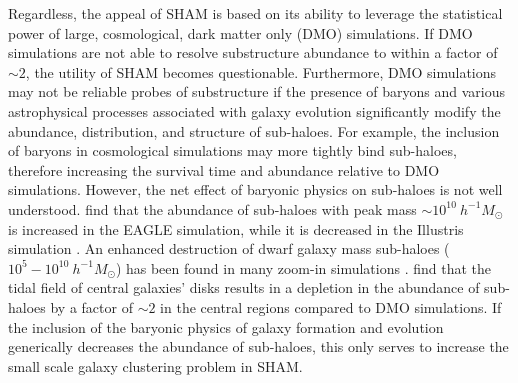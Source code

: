 \documentclass[useAMS,fleqn,usenatbib]{mnras}
\begin{document}
Regardless, the appeal of SHAM is based on its ability to leverage the statistical power of large, cosmological, dark matter only (DMO) simulations.  If DMO simulations are not able to resolve substructure abundance to within a factor of $\sim 2$, the utility of SHAM becomes questionable.  Furthermore, DMO simulations may not be reliable probes of substructure if the presence of baryons and various astrophysical processes associated with galaxy evolution significantly modify the abundance, distribution, and structure of sub-haloes.  For example, the inclusion of baryons in cosmological simulations may more tightly bind sub-haloes, therefore increasing the survival time and abundance \citep{Fiacconi:2016ba} relative to DMO simulations.  However, the net effect of baryonic physics on sub-haloes is not well understood.  \citet{Despali:2016uv} find that the abundance of sub-haloes with peak mass $\sim 10^{10}~h^{-1}M_{\odot}$ is increased in the EAGLE simulation, while it is decreased in the Illustris simulation \citep{Vogelsberger:2014gw}.  An enhanced destruction of dwarf galaxy mass sub-haloes ($10^{5} -10^{10} ~h^{-1}M_{\odot}$) has been found in many zoom-in simulations \citep{Read:2006da, Read:2006hw, Brooks:2014jv, Wetzel:2016iy}.  \citet{GarrisonKimmel:2017tu} find that the tidal field of central galaxies' disks results in a depletion in the abundance of sub-haloes by a factor of $\sim 2$ in the central regions compared to DMO simulations.  If the inclusion of the baryonic physics of galaxy formation and evolution generically decreases the abundance of sub-haloes, this only serves to increase the small scale galaxy clustering problem in SHAM.  
\end{document}
